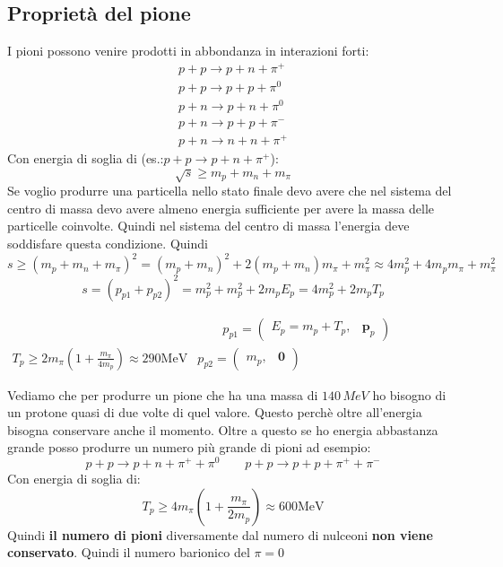 \subsection{Proprietà del pione}
I pioni possono venire prodotti in abbondanza in interazioni forti:
\begin{align*}
    p+p \rightarrow p+n+\pi^{+} \\  p+p \rightarrow p+p+\pi^0 \\ p+n \rightarrow p+n+\pi^0 \\  p+n \rightarrow p+p+\pi^{-} \\  p+n \rightarrow n+n+\pi^{+}
\end{align*}
Con energia di soglia di (es.:$p+p \rightarrow p+n+\pi^{+}$):
\begin{equation*}
    \sqrt{s}\ge m_p+m_n+m_\pi
\end{equation*}
Se voglio produrre una particella nello stato finale devo avere che nel sistema del centro di massa devo avere almeno energia sufficiente per avere la massa delle particelle coinvolte. Quindi nel sistema del centro di massa l'energia deve soddisfare questa condizione. Quindi
\begin{equation*}
    s\ge\left(m_p+m_n+m_\pi\right)^2=\left(m_p+m_n\right)^2+2\left(m_p+m_n\right) m_\pi+m_\pi^2 \approx 4 m_p^2+4 m_p m_\pi+m_\pi^2
\end{equation*}
\begin{equation*}
    s=\left(p_{p 1}+p_{p 2}\right)^2=m_p^2+m_p^2+2 m_p E_p=4 m_p^2+2 m_p T_p
\end{equation*}


$\begin{array}{lc}
& \qquad p_{p 1}=\left(\begin{array}{ll}E_p=m_p+T_p, & \mathbf{p}_p\end{array}\right) \\ T_p \geq 2 m_\pi\left(1+\frac{m_\pi}{4 m_p}\right) \approx 290 \mathrm{MeV} & p_{p 2}=\left(\begin{array}{ll}m_p, & \mathbf{0}\end{array}\right)\end{array}$

Vediamo che per produrre un pione che ha una massa di $140\,MeV$ ho bisogno di un protone quasi di due volte di quel valore. Questo perchè oltre all'energia bisogna conservare anche il momento. Oltre a questo se ho energia abbastanza grande posso produrre un numero più grande di pioni ad esempio:
\begin{equation*}
    p+p\to p+n+\pi^++\pi^0 \qquad p+p\to p+p+\pi^++\pi^-
\end{equation*}
Con energia di soglia di:
\begin{equation*}
    T_p \geq 4 m_\pi\left(1+\frac{m_\pi}{2 m_p}\right) \approx 600 \mathrm{MeV}
\end{equation*}
Quindi \textbf{il numero di pioni} diversamente dal numero di nulceoni \textbf{non viene conservato}. Quindi il numero barionico del $\pi=0$

